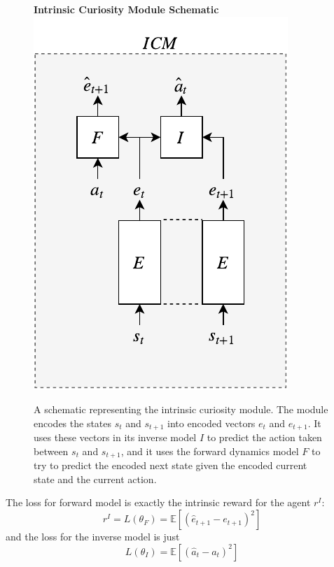 \documentclass[journal, onecolumn, 12pt, draftclsnofoot]{IEEEtran}
\begin{document}
	\begin{figure}[ht]
		\begin{center}
			\textbf{Intrinsic Curiosity Module Schematic} \\
		\includegraphics[scale=1]{fig/ICM.pdf}
	\end{center}
		\caption{A schematic representing the intrinsic curiosity module. The module encodes the states $s_t$ and $s_{t+1}$ into encoded vectors $e_t$ and $e_{t+1}$. It uses these vectors in its inverse model $I$ to predict the action taken between $s_t$ and $s_{t+1}$, and it uses the forward dynamics model $F$ to try to predict the encoded next state given the encoded current state and the current action.}
		\label{fig:ICM}
	\end{figure}
	\par The loss for forward model is exactly the intrinsic reward for the agent $r^I$:
	\begin{equation}
		\label{eqn:forward-loss}
		r^I = L(\theta_F) = \mathbb{E} \left[ (\hat{e}_{t+1} - e_{t+1})^2 \right]
	\end{equation}
	and the loss for the inverse model is just
	\begin{equation}
		\label{eqn:inverse-loss}
		L(\theta_I) = \mathbb{E} \left[ (\hat{a}_t - a_t)^2 \right]
	\end{equation}
\end{document}
